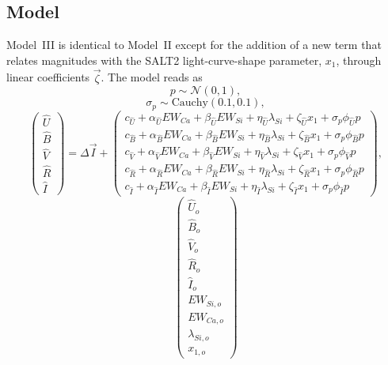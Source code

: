 \documentclass[trackchanges]{aastex61}   	%
\begin{document}
{\subsection{Model}
\label{modelIImodel:sec}
Model~III is identical to Model~II except for the 
addition of a new term  that relates magnitudes with the SALT2 light-curve-shape parameter,
$x_1$, through linear coefficients $\vec{\zeta}$. 
The model reads as
\begin{equation}
p  \sim \mathcal{N}(0,1 ),
\end{equation}
\begin{equation}
\sigma_p  \sim \text{Cauchy}(0.1,0.1),
\end{equation}
\begin{equation}
\begin{pmatrix}
{\hat{U}}\\{\hat{B}}\\{\hat{V}}\\{\hat{R}}\\{\hat{I}}
\end{pmatrix}
=
\Delta  \vec{I} +
\begin{pmatrix}
c_{\hat{U}}+\alpha_{\hat{U}} EW_{Ca} + \beta_{\hat{U}} EW_{Si} + \eta_{\hat{U}} \lambda_{Si} +\zeta_{\hat{U}} x_1 + \sigma_p\phi_{\hat{U}} p\\
c_{\hat{B}}+\alpha_{\hat{B}} EW_{Ca} + \beta_{\hat{B}} EW_{Si} + \eta_{\hat{B}} \lambda_{Si} +\zeta_{\hat{B}} x_1 + \sigma_p\phi_{\hat{B}} p\\
c_{\hat{V}}+\alpha_{\hat{V}} EW_{Ca} + \beta_{\hat{V}} EW_{Si} + \eta_{\hat{V}} \lambda_{Si} +\zeta_{\hat{V}} x_1+ \sigma_p\phi_{\hat{V}}  p\\
c_{\hat{R}}+\alpha_{\hat{R}} EW_{Ca} + \beta_{\hat{R}} EW_{Si} + \eta_{\hat{R}} \lambda_{Si} +\zeta_{\hat{R}} x_1+ \sigma_p\phi_{\hat{R}} p\\
c_{\hat{I}}+\alpha_{\hat{I}} EW_{Ca} + \beta_{\hat{I}} EW_{Si}+ \eta_{\hat{I}} \lambda_{Si}+\zeta_{\hat{I}} x_1+ \sigma_p\phi_{\hat{I}}  p
\end{pmatrix},
\label{ewsiv3:eqn}
\end{equation}
\begin{equation}
\begin{pmatrix}
{\hat{U}}_o\\{\hat{B}}_o\\ {\hat{V}}_o\\{\hat{R}}_o\\{\hat{I}}_o\\EW_{Si, o}\\ EW_{Ca, o} \\ \lambda_{Si, o} \\ x_{1, o}

\end{pmatrix}
\end{equation}}
\end{document}
